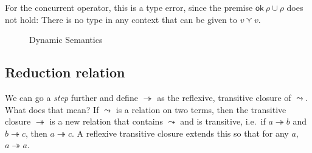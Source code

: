 For the concurrent operator, this is a type error, since the
premise $\textsf{ok} \ \rho \cup \rho$ does not hold: There is no type in any context
that can be given to $v \curlyvee v$.

\begin{figure}
  \caption{Dynamic Semantics}\label{fig:dynamicsemantics}
\end{figure}

\subsection{Reduction relation}

We can go a \textit{step} further and define $\twoheadrightarrow$ as the reflexive,
transitive closure of $\leadsto$. What does that mean? If $\leadsto$ is a relation
on two terms, then the transitive closure $\twoheadrightarrow$ is a new relation that
contains $\leadsto$ and is transitive, i.e.\ if
$a \twoheadrightarrow b$ and $b \twoheadrightarrow c$, then
$a \twoheadrightarrow c$.  A reflexive transitive closure extends this so that for any
$a$, $a \twoheadrightarrow a$.

